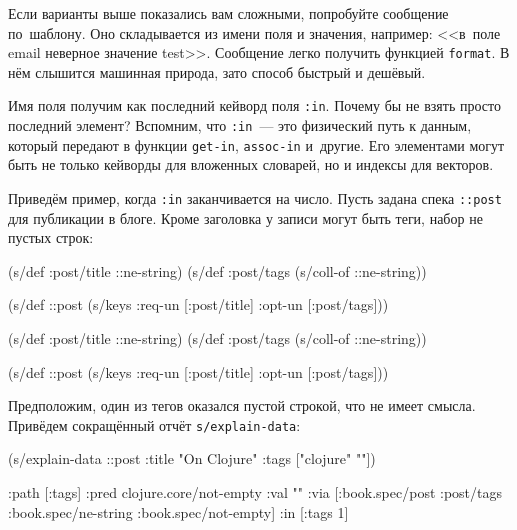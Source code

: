 
Если варианты выше показались вам сложными, попробуйте сообщение по~шаблону. Оно
складывается из имени поля и значения, например: <<в~поле email неверное
значение test>>. Сообщение легко получить функцией \verb|format|. В нём
слышится машинная природа, зато способ быстрый и дешёвый.

Имя поля получим как последний кейворд поля \verb|:in|. Почему бы не взять
просто последний элемент? Вспомним, что \verb|:in|~--- это физический путь к данным,
который передают в функции \verb|get-in|, \verb|assoc-in| и~другие. Его
элементами могут быть не только кейворды для вложенных словарей, но и индексы
для векторов.

Приведём пример, когда \verb|:in| заканчивается на число. Пусть задана
спека \verb|::post| для публикации в блоге. Кроме заголовка у записи могут
быть теги, набор не пустых строк:

\ifx\DEVICETYPE\MOBILE

\begin{english}
  \begin{clojure}
(s/def :post/title ::ne-string)
(s/def :post/tags
  (s/coll-of ::ne-string))

(s/def ::post
  (s/keys :req-un [:post/title]
          :opt-un [:post/tags]))
  \end{clojure}
\end{english}

\else

\begin{english}
  \begin{clojure}
(s/def :post/title ::ne-string)
(s/def :post/tags (s/coll-of ::ne-string))

(s/def ::post (s/keys :req-un [:post/title]
                      :opt-un [:post/tags]))
  \end{clojure}
\end{english}

\fi

Предположим, один из тегов оказался пустой строкой, что не имеет
смысла. Привёдем сокращённый отчёт \verb|s/explain-data|:

\ifx\DEVICETYPE\MOBILE

\begin{english}
  \begin{clojure}
(s/explain-data ::post
  {:title "On Clojure"
   :tags ["clojure" ""]})

{:path [:tags]
 :pred clojure.core/not-empty
 :val ""
 :via [:book.spec/post
       :post/tags
       :book.spec/ne-string
       :book.spec/not-empty]
 :in [:tags 1]}
  \end{clojure}
\end{english}

